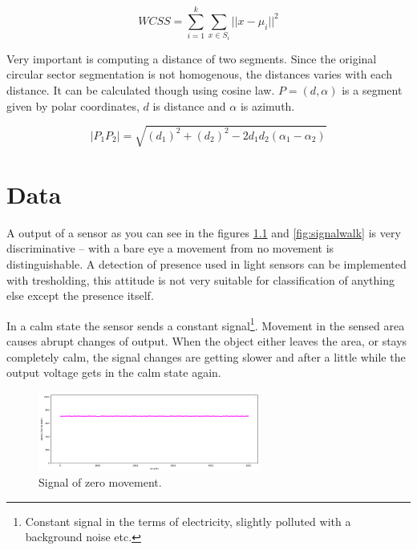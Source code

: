 \begin{equation}
\mathit{WCSS} = \sum_{i=1}^{k} \sum_{x \in S_i} ||x - \mu_i||^2
\end{equation}

Very important is computing a distance of two segments. Since the original circular sector segmentation
is not homogenous, the distances varies with each distance. It can be calculated though using
cosine law. $P = (d, \alpha)$ is a segment given by polar coordinates, $d$ is distance and $\alpha$ is
azimuth.

\begin{equation}
|P_{1} P_{2}| = \sqrt{(d_{1})^{2} + (d_{2})^{2} - 2d_{1}d_{2}(\alpha_1 - \alpha_2)}
\end{equation}




\chapter{Data}

A output of a sensor as you can see in the figures \ref{fig:signalcalm} and \ref{fig:signalwalk}
is very discriminative -- with a bare eye a movement from no movement is distinguishable.
A detection of presence used in light sensors can be implemented with tresholding, this attitude is
not very suitable for classification of anything else except the presence itself.

In a calm state the sensor sends a constant signal\footnote{Constant signal in the terms
of electricity, slightly polluted with a background noise etc.}. Movement in the sensed area causes
abrupt changes of output. When the object either leaves the area, or stays completely calm, the signal
changes are getting slower and after a little while the output voltage gets in the calm state again.

\begin{figure}[h!]
\begin{center}
\includegraphics[width=0.65\textwidth]{render/signal_calm.png}
\caption{Signal of zero movement.\label{fig:signalcalm}}
\end{center}
\end{figure}

